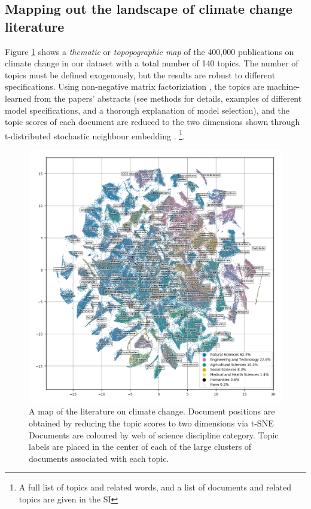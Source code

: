 \documentclass{article}
\begin{document}
\begin{linenumbers}
		
		\subsection*{Mapping out the landscape of climate change literature}
		
		Figure \ref{oecd_topic_map} shows a \emph{thematic} or \emph{topopographic map} of the 400,000 publications on climate change in our dataset with a total number of 140 topics. The number of topics must be defined exogenously, but the results are robust to different specifications. Using non-negative matrix factoriziation \cite{Lee1999}, the topics are machine-learned from the papers' abstracts (see methods for details, examples of different model specifications, and a thorough explanation of model selection), and the topic scores of each document are reduced to the two dimensions shown through t-distributed stochastic neighbour embedding \cite{vandermaaten2008}. \footnote{A full list of topics and related words, and a list of documents and related topics are given in the SI}.
		
		
		\begin{figure}[htp]
			\begin{center}
				\includegraphics[width=180mm]{plots_pub/all_topic_words_oecds.png}
				\caption{A map of the literature on climate change. Document positions are obtained by reducing the topic scores to two dimensions via t-SNE Documents are coloured by web of science discipline category. Topic labels are placed in the center of each of the large clusters of documents associated with each topic. }
				\label{oecd_topic_map}
			\end{center}
		\end{figure}
		

\end{linenumbers}
\end{document}

